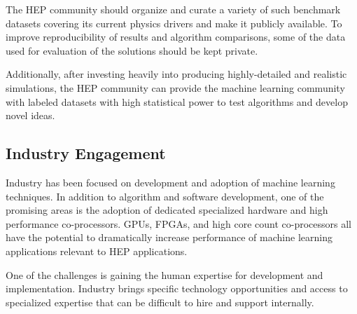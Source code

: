 

The HEP community should organize and curate a variety of such benchmark datasets covering its current physics drivers and make it publicly available. To improve reproducibility of results and algorithm comparisons, some of the data used for evaluation of the solutions should be kept private.


Additionally, after investing heavily into producing highly-detailed and realistic simulations, the HEP community can provide the machine learning community with labeled datasets with high statistical power to test algorithms and develop novel ideas.



\subsection{Industry Engagement}
Industry has been focused on development and adoption of machine learning techniques. In addition to algorithm and software development, one of the promising areas is the adoption of dedicated specialized hardware and high performance co-processors. GPUs, FPGAs, and high core count co-processors all have the potential to dramatically increase performance of machine learning applications relevant to HEP applications.

One of the challenges is gaining the human expertise for development and implementation. Industry brings specific technology opportunities and access to specialized expertise that can be difficult to hire and support internally.

